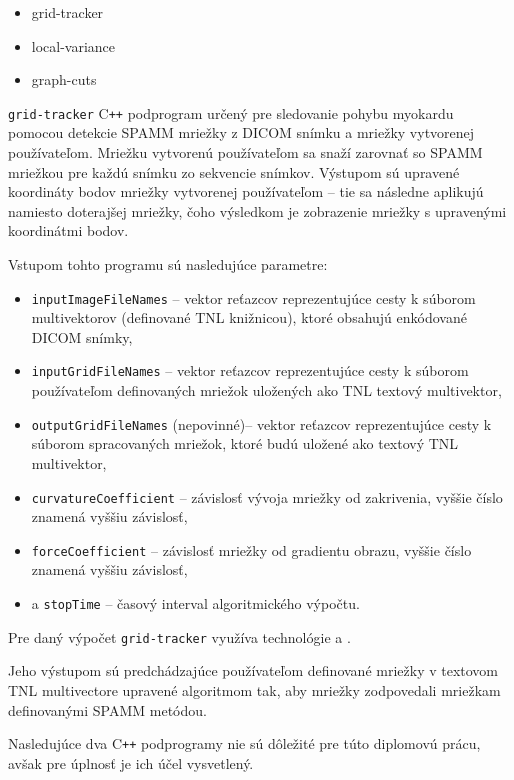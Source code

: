 \begin {itemize}
\item {grid-tracker}
\item {local-variance}
\item {graph-cuts}
\end {itemize}

\texttt{grid-tracker} C\texttt{++} podprogram určený pre sledovanie pohybu myokardu pomocou detekcie SPAMM mriežky z DICOM snímku a mriežky vytvorenej používateľom. Mriežku vytvorenú používateľom sa snaží zarovnať so SPAMM mriežkou pre každú snímku zo sekvencie snímkov. Výstupom sú upravené koordináty bodov mriežky vytvorenej používateľom -- tie sa následne aplikujú namiesto doterajšej mriežky, čoho výsledkom je zobrazenie mriežky s upravenými koordinátmi bodov. \newline

Vstupom tohto programu sú nasledujúce parametre:
\begin {itemize}
\item {\texttt{inputImageFileNames} -- vektor reťazcov reprezentujúce cesty k súborom multivektorov (definované TNL knižnicou), ktoré obsahujú enkódované DICOM snímky,}
\item {\texttt{inputGridFileNames} -- vektor reťazcov reprezentujúce cesty k súborom používateľom definovaných mriežok uložených ako TNL textový multivektor,}
\item {\texttt{outputGridFileNames} (nepovinné)-- vektor reťazcov reprezentujúce cesty k súborom spracovaných mriežok, ktoré budú uložené ako textový TNL multivektor,}
\item {\texttt{curvatureCoefficient} -- závislosť vývoja mriežky od zakrivenia, vyššie číslo znamená vyššiu závislosť,}
\item {\texttt{forceCoefficient} -- závislosť mriežky od gradientu obrazu, vyššie číslo znamená vyššiu závislosť,}
\item {a \texttt{stopTime} -- časový interval algoritmického výpočtu.}
\end {itemize}

Pre daný výpočet \texttt{grid-tracker} využíva technológie  a .

Jeho výstupom sú predchádzajúce používateľom definované mriežky v textovom TNL multivectore upravené algoritmom tak, aby mriežky zodpovedali mriežkam definovanými SPAMM metódou. \newline

Nasledujúce dva C\texttt{++} podprogramy nie sú dôležité pre túto diplomovú prácu, avšak pre úplnosť je ich účel vysvetlený. \newline

